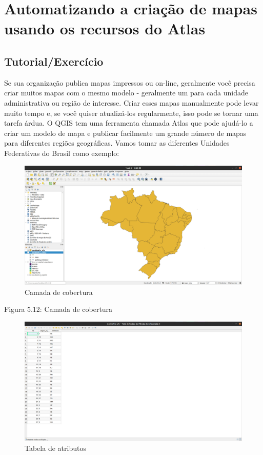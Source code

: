 \documentclass[
]{krantz}
\begin{document}
\hypertarget{automatizando-a-criauxe7uxe3o-de-mapas-usando-os-recursos-do-atlas}{%
\section{Automatizando a criação de mapas usando os recursos do Atlas}\label{automatizando-a-criauxe7uxe3o-de-mapas-usando-os-recursos-do-atlas}}

\hypertarget{tutorialexercuxedcio-3}{%
\subsection{Tutorial/Exercício}\label{tutorialexercuxedcio-3}}

Se sua organização publica mapas impressos ou on-line, geralmente você precisa criar muitos mapas com o mesmo modelo - geralmente um para cada unidade administrativa ou região de interesse. Criar esses mapas manualmente pode levar muito tempo e, se você quiser atualizá-los regularmente, isso pode se tornar uma tarefa árdua. O QGIS tem uma ferramenta chamada Atlas que pode ajudá-lo a criar um modelo de mapa e publicar facilmente um grande número de mapas para diferentes regiões geográficas. Vamos tomar as diferentes Unidades Federativas do Brasil como exemplo:

\begin{figure}
\centering
\includegraphics{media/modulo5/atlas-coverage.png}
\caption{Camada de cobertura}
\end{figure}

Figura 5.12: Camada de cobertura

\begin{figure}
\centering
\includegraphics{media/modulo5/atlas-attr.png}
\caption{Tabela de atributos}
\end{figure}
\end{document}
